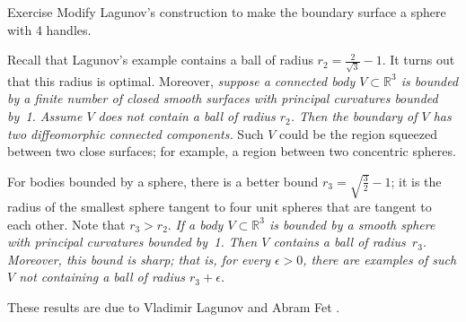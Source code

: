 \begin{thm}{Exercise}\label{ex:lagunov-genus4}
Modify Lagunov's construction to make the boundary surface a sphere with 4 handles.
\end{thm}

Recall that Lagunov's example contains a ball of radius $r_2=\tfrac2{\sqrt{3}}-1$.
It turns out that this radius is optimal.
Moreover, 
\textit{suppose a connected body $V\subset \mathbb{R}^3$ is bounded by a finite number of closed smooth surfaces with principal curvatures bounded by~1.
Assume $V$ does not contain a ball of radius $r_2$.
Then the boundary of $V$ has two diffeomorphic connected components.}
Such $V$ could be the region squeezed between two close surfaces;
for example, a region between two concentric spheres.

For bodies bounded by a sphere, there is a better bound $r_3=\sqrt{\tfrac32}-1$;
it is the radius of the smallest sphere tangent to four unit spheres that are tangent to each other.
Note that $r_3>r_2$.
\textit{If a body $V\subset \mathbb{R}^3$ is bounded by a smooth sphere with principal curvatures bounded  by~1.
Then $V$ contains a ball of radius~$r_3$.
Moreover, this bound is sharp; that is, for every $\epsilon>0$, there are examples of such $V$ not containing a ball of radius $r_3+\epsilon$.}

These results are due to Vladimir Lagunov and Abram Fet \cite{lagunov-1960, lagunov-fet-1963, lagunov-fet-1965}.

